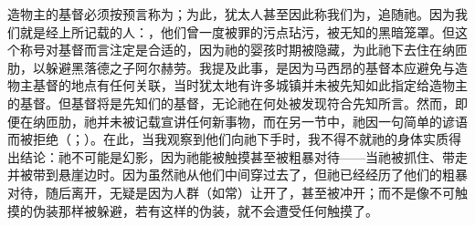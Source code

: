 造物主的基督必须按预言称为；为此，犹太人甚至因此称我们为，追随祂。因为我们就是经上所记载的人：，他们曾一度被罪的污点玷污，被无知的黑暗笼罩。但这个称号对基督而言注定是合适的，因为祂的婴孩时期被隐藏，为此祂下去住在纳匝肋，以躲避黑落德之子阿尔赫劳。我提及此事，是因为马西昂的基督本应避免与造物主基督的地点有任何关联，当时犹太地有许多城镇并未被先知如此指定给造物主的基督。但基督将是先知们的基督，无论祂在何处被发现符合先知所言。然而，即便在纳匝肋，祂并未被记载宣讲任何新事物，而在另一节中，祂因一句简单的谚语而被拒绝（；）。在此，当我观察到他们向祂下手时，我不得不就祂的身体实质得出结论：祂不可能是幻影，因为祂能被触摸甚至被粗暴对待——当祂被抓住、带走并被带到悬崖边时。因为虽然祂从他们中间穿过去了，但祂已经经历了他们的粗暴对待，随后离开，无疑是因为人群（如常）让开了，甚至被冲开；而不是像不可触摸的伪装那样被躲避，若有这样的伪装，就不会遭受任何触摸了。\par

\par

